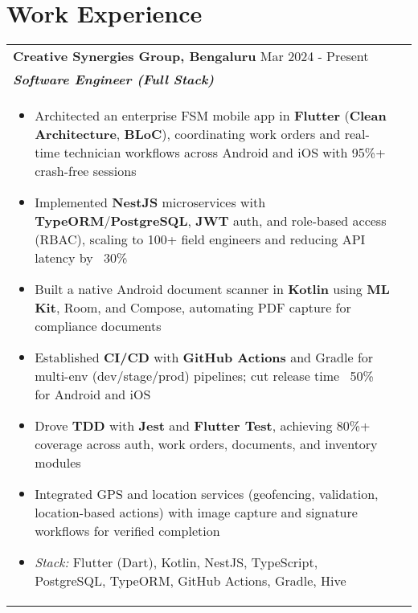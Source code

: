 \documentclass[a4paper,8pt]{article}
\begin{document}
\section{Work Experience}
\begin{tabularx}{\linewidth}{ @{}l r@{} }
\textbf{{Creative Synergies Group, Bengaluru}} \hfill \color[HTML]{371e77} Mar 2024 - Present \\[4pt]
\color[HTML]{371e77}\textbf{\textit{Software Engineer (Full Stack)}}\ \hfill \color[HTML]{4B28A4} \\[5pt]
\begin{minipage}[t]{\linewidth}
    \begin{itemize}[nosep,after=\strut, leftmargin=2em, itemsep=2pt]
        \item Architected an enterprise FSM mobile app in \textbf{Flutter} (\textbf{Clean Architecture}, \textbf{BLoC}), coordinating work orders and real-time technician workflows across Android and iOS with 95\%+ crash-free sessions
        \item Implemented \textbf{NestJS} microservices with \textbf{TypeORM}/\textbf{PostgreSQL}, \textbf{JWT} auth, and role-based access (RBAC), scaling to 100+ field engineers and reducing API latency by ~30\%
        \item Built a native Android document scanner in \textbf{Kotlin} using \textbf{ML Kit}, Room, and Compose, automating PDF capture for compliance documents
        \item Established \textbf{CI/CD} with \textbf{GitHub Actions} and Gradle for multi-env (dev/stage/prod) pipelines; cut release time ~50\% for Android and iOS
        \item Drove \textbf{TDD} with \textbf{Jest} and \textbf{Flutter Test}, achieving 80\%+ coverage across auth, work orders, documents, and inventory modules
        \item Integrated GPS and location services (geofencing, validation, location-based actions) with image capture and signature workflows for verified completion
        \item \textit{Stack:} Flutter (Dart), Kotlin, NestJS, TypeScript, PostgreSQL, TypeORM, GitHub Actions, Gradle, Hive
    \end{itemize}
\end{minipage}
\end{tabularx}
\end{document}
